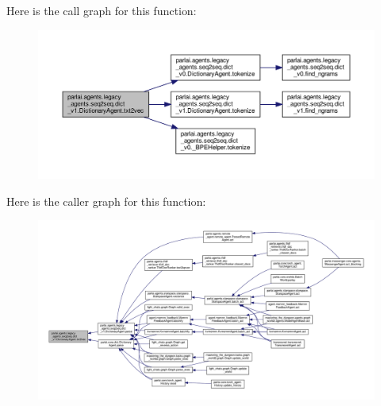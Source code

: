 Here is the call graph for this function\+:
\nopagebreak
\begin{figure}[H]
\begin{center}
\leavevmode
\includegraphics[width=350pt]{classparlai_1_1agents_1_1legacy__agents_1_1seq2seq_1_1dict__v1_1_1DictionaryAgent_a8419b546a12830d98e1eb14615744294_cgraph}
\end{center}
\end{figure}
Here is the caller graph for this function\+:
\nopagebreak
\begin{figure}[H]
\begin{center}
\leavevmode
\includegraphics[width=350pt]{classparlai_1_1agents_1_1legacy__agents_1_1seq2seq_1_1dict__v1_1_1DictionaryAgent_a8419b546a12830d98e1eb14615744294_icgraph}
\end{center}
\end{figure}
\mbox{\label{classparlai_1_1agents_1_1legacy__agents_1_1seq2seq_1_1dict__v1_1_1DictionaryAgent_a8dd6e4af55a5f5d05d692198e044c5fe}} 
